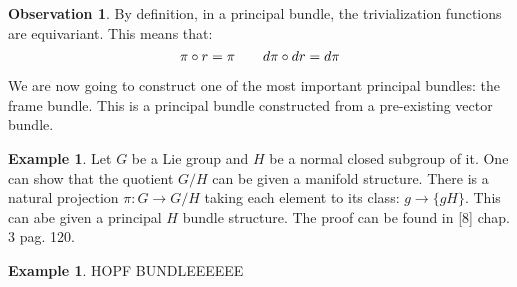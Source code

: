 \documentclass[12pt,a4paper]{report}
\theoremstyle{definition}
\theoremstyle{Theorem}
\theoremstyle{definition}
\newtheorem{Ex}[Def]{Example}
\theoremstyle{definition}
\newtheorem{Obs}[Def]{Observation}
\begin{document}
	\begin{Obs} \label{Obs_3.5.1}
		By definition, in a principal bundle, the trivialization functions are equivariant. This means that:
		$$\pi\circ r=\pi\hspace{20 pt}d\pi\circ dr=d\pi$$
	\end{Obs}
	We are now going to construct one of the most important principal bundles: the frame bundle. This is a principal bundle constructed from a pre-existing vector bundle.
	\begin{Ex}
		Let $G$ be a Lie group and $H$ be a normal closed subgroup of it. One can show that the quotient $G/H$ can be given a manifold structure.
		There is a natural projection $\pi:G\rightarrow G/H$ taking each element to its class: $g\rightarrow \{gH\}$. This can abe given a principal $H$ bundle structure. The proof can be found in [8] chap. 3 pag. 120.
	\end{Ex}
	\begin{Ex}
		HOPF BUNDLEEEEEE
	\end{Ex}
\end{document}
